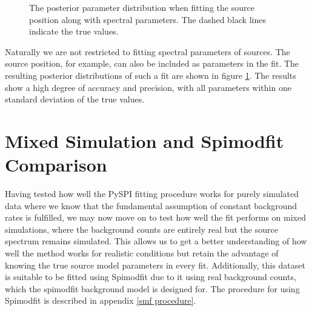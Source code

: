 \documentclass{report}
\begin{document}
\begin{figure}[h]
  \centering
  \caption{The posterior parameter distribution when fitting the source position along with spectral parameters. The dashed black lines indicate the true values.}
  \label{fig pos fit}
\end{figure}

Naturally we are not restricted to fitting spectral parameters of sources. The source position, for example, can also be included as parameters in the fit. The resulting posterior distributions of such a fit are shown in figure \ref{fig pos fit}. The results show a high degree of accuracy and precision, with all parameters within one standard deviation of the true values.


\section{Mixed Simulation and Spimodfit Comparison} \label{sec: smf comparison}




Having tested how well the PySPI fitting procedure works for purely simulated data where we know that the fundamental assumption of constant background rates is fulfilled, we may now move on to test how well the fit performs on mixed simulations, where the background counts are entirely real but the source spectrum remains simulated. This allows us to get a better understanding of how well the method works for realistic conditions but retain the advantage of knowing the true source model parameters in every fit. Additionally, this dataset is suitable to be fitted using Spimodfit due to it using real background counts, which the spimodfit background model is designed for. The procedure for using Spimodfit is described in appendix \ref{smf procedure}.
\end{document}
